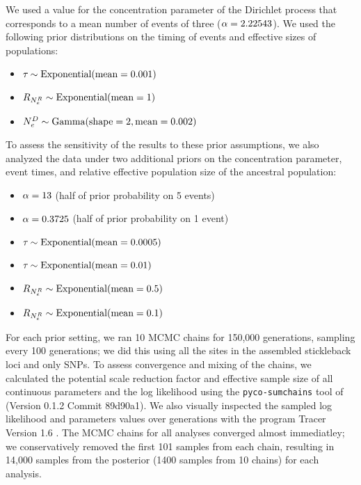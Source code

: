 We used a value for the concentration parameter of the Dirichlet process
that corresponds to a mean number of events of three
($\concentration = 2.22543$).
We used the following prior distributions on the timing of events and effective
sizes of populations:
\begin{itemize}
    \item $\etime \sim \dexponential{0.001}$
    \item $\rootrelativepopsize \sim \dexponential{1}$
    \item $\epopsize[\descendantpopindex{}] \sim \dgamma{2}{0.002}$
\end{itemize}
To assess the sensitivity of the results to these prior assumptions,
we also analyzed the data under two additional priors on
the concentration parameter, event times, and relative
effective population size of the ancestral population:
\begin{itemize}
    \item $\concentration = 13$ (half of prior probability on 5 events)
    \item $\concentration = 0.3725$ (half of prior probability on 1 event)
    \item $\etime \sim \dexponential{0.0005}$
    \item $\etime \sim \dexponential{0.01}$
    \item $\rootrelativepopsize \sim \dexponential{0.5}$
    \item $\rootrelativepopsize \sim \dexponential{0.1}$
\end{itemize}

For each prior setting, we ran 10 MCMC chains for 150,000 generations, sampling
every 100 generations; we did this using all the sites in the assembled
stickleback loci and only SNPs.
To assess convergence and mixing of the chains, we calculated the potential
scale reduction factor \citep[PSRF; the square root of Equation 1.1 in][]{Brooks1998}
and effective sample size \citep{Gong2014} of all continuous parameters and the
log likelihood using the \texttt{pyco-sumchains} tool of \pycoevolity
(Version 0.1.2 Commit 89d90a1).
We also visually inspected the sampled log likelihood and parameters values
over generations with the program Tracer Version 1.6 \citep{Tracer16}.
The MCMC chains for all analyses converged almost immediatley; we
conservatively removed the first 101 samples from each chain, resulting in
14,000 samples from the posterior (1400 samples from 10 chains) for each
analysis.

